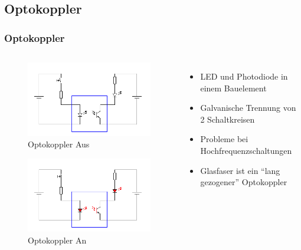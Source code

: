 \subsection*{Optokoppler}
\begin{frame}
  \frametitle{Optokoppler}
  \begin{columns}[c]
    \column[c]{5cm}
    \begin{center}
      \begin{figure}
        \includegraphics[width=1\textwidth,height=.25\textheight,keepaspectratio]{e12/Optokoppler_Aus.png}
        \caption{Optokoppler Aus}
      \end{figure}
      \begin{figure}
        \includegraphics[width=1\textwidth,height=.25\textheight,keepaspectratio]{e12/Optokoppler_An.png}
        \caption{Optokoppler An}
      \end{figure}
    \end{center}
    \column{5cm}
    \begin{itemize}
      \item LED und Photodiode in einem Bauelement
      \item Galvanische Trennung von 2 Schaltkreisen
      \item Probleme bei Hochfrequenzschaltungen
      \item Glasfaser ist ein ``lang gezogener'' Optokoppler
    \end{itemize}
  \end{columns}
\end{frame}


